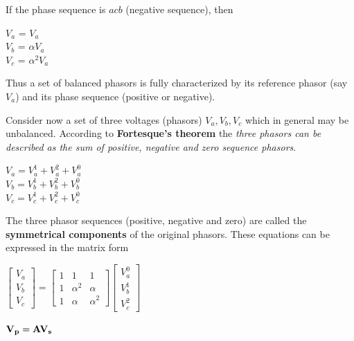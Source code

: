 \documentclass[a4paper,12pt]{article}
\begin{document}
    If the phase sequence is $acb$ (negative sequence), then
    \begin{center}
      $V_a$ = $V_a$\\
      $V_b$ = $\alpha V_a$\\
      $V_c$ = $\alpha^2 V_a$\\
    \end{center}

    Thus a set of balanced phasors is fully characterized by its reference phasor
    (say $V_a$) and its phase sequence (positive or negative).

    Consider now a set of three voltages (phasors) $V_a, V_b, V_c$ which in general may
    be unbalanced. According to {\bf Fortesque's theorem} the {\it three phasors can be
    described as the sum of positive, negative and zero sequence phasors}.

    \begin{center}
      $V_a = V_a^1 + V_a^2 + V_a^0$\\
      $V_b = V_b^1 + V_b^2 + V_b^0$\\
      $V_c = V_c^1 + V_c^2 + V_c^0$
    \end{center}

    The three phasor sequences (positive, negative and zero) are called the
    {\bf symmetrical components} of the original phasors. These equations 
    can be expressed in the matrix form
    
    \begin{center}
      \begin{math}
        \begin{bmatrix}
          V_a \\ V_b \\ V_c
        \end{bmatrix}
        =
        \begin{bmatrix}
          1 & 1        & 1 \\
          1 & \alpha^2 & \alpha \\
          1 & \alpha   & \alpha^2
        \end{bmatrix}
        \begin{bmatrix}
          V^0_a \\ V^1_b \\ V^2_c
        \end{bmatrix}
      \end{math}
    \end{center}

    \begin{center}
      $ \bf V_p = A V_s $\\
    \end{center}
\end{document}
